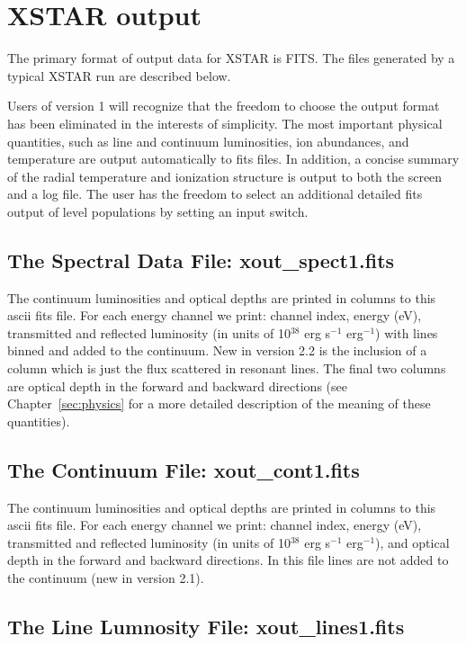 \chapter{XSTAR output}
\label{sec:output}

The primary format of output data for XSTAR is FITS.  The files 
generated by a typical XSTAR run are described below.

Users of version 1 will recognize that the freedom to choose the output 
format has been eliminated in the interests of simplicity.  The most important 
physical quantities, such as line and continuum luminosities, ion abundances, 
and temperature are output automatically to fits files.  In addition, a 
concise summary of the radial temperature and ionization structure is output
to both the screen and a log file.  The user has the freedom to select an 
additional detailed fits output of level populations by setting an input switch.

\section{The Spectral Data File: xout\_spect1.fits}

The continuum luminosities and optical depths are printed in columns to 
this ascii fits file.  For each energy channel we
print: channel index, energy (eV), transmitted and reflected luminosity 
(in units of 10$^{38}$ erg s$^{-1}$ erg$^{-1}$) with lines binned and 
added to the continuum.  New in version 2.2 is the inclusion of a column which 
is just the flux scattered in resonant lines.  The final two columns are  optical 
depth in the forward and backward directions (see Chapter~\ref{sec:physics} for a 
more detailed description of the meaning of these quantities).  

\section{The Continuum  File: xout\_cont1.fits}

The continuum luminosities and optical depths are printed in columns to 
this ascii fits file.  For each energy channel we
print: channel index, energy (eV), transmitted and reflected luminosity 
(in units of 10$^{38}$ erg s$^{-1}$ erg$^{-1}$), and optical 
depth in the forward and backward directions. In this file lines are not
added to the continuum (new in version 2.1).

\section{The Line Lumnosity  File: xout\_lines1.fits}


